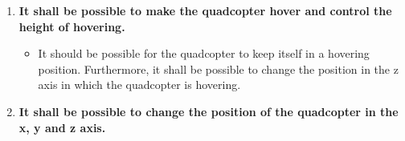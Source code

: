 \begin{enumerate}[label=\textbf{\arabic*})]
\item \textbf{It shall be possible to make the quadcopter hover and control the height of hovering.}
\begin{itemize}
\item[] It should be possible for the quadcopter to keep itself in a hovering position. Furthermore, it shall be possible to change the position in the z axis in which the quadcopter is hovering.
\end{itemize}

\item \textbf{It shall be possible to change the position of the quadcopter in the x, y and z axis.}
\end{enumerate}
%
%
%
%
%
%
%


